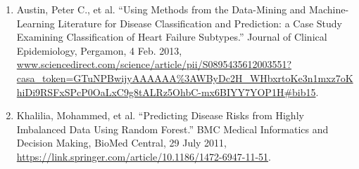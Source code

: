 \documentclass[12pt]{article}
\begin{document}
\begin{enumerate}
    \item Austin, Peter C., et al. “Using Methods from the Data-Mining and Machine-Learning Literature for Disease Classification and Prediction: a Case Study Examining Classification of Heart Failure Subtypes.” Journal of Clinical Epidemiology, Pergamon, 4 Feb. 2013, \\ \url{www.sciencedirect.com/science/article/pii/S0895435612003551?casa_token=GTuNPBwijyAAAAAA%3AWByDc2H_WHbxrtoKe3n1mxz7oKhiDi9RSFxSPcP0OaLxC9g8tALRz5OhbC-mx6BIYY7YOP1H\#bib15}.
    \item Khalilia, Mohammed, et al. “Predicting Disease Risks from Highly Imbalanced Data Using Random Forest.” BMC Medical Informatics and Decision Making, BioMed Central, 29 July 2011, \url{https://link.springer.com/article/10.1186/1472-6947-11-51}.
\end{enumerate}
\end{document}
